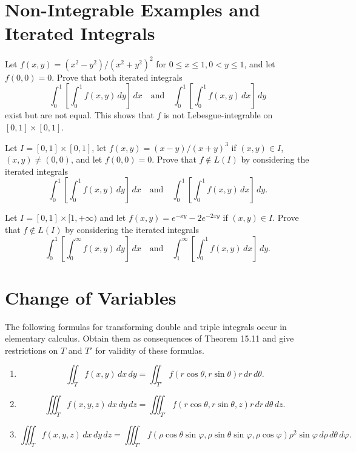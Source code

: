 \section{Non-Integrable Examples and Iterated Integrals}

\begin{problembox}
Let \( f(x, y) = (x^2 - y^2)/(x^2 + y^2)^2 \) for \( 0 \leq x \leq 1, 0 < y \leq 1 \), and let \( f(0, 0) = 0 \). Prove that both iterated integrals
\[
\int_0^1 \left[ \int_0^1 f(x, y) \, dy \right] \, dx \quad \text{and} \quad \int_0^1 \left[ \int_0^1 f(x, y) \, dx \right] \, dy
\]
exist but are not equal. This shows that \( f \) is not Lebesgue-integrable on \([0, 1] \times [0, 1]\).
\end{problembox}

\begin{problembox}
Let \( I = [0, 1] \times [0, 1] \), let \( f(x, y) = (x - y)/(x + y)^3 \) if \( (x, y) \in I \), \( (x, y) \neq (0, 0) \), and let \( f(0, 0) = 0 \). Prove that \( f \notin L(I) \) by considering the iterated integrals
\[
\int_0^1 \left[ \int_0^1 f(x, y) \, dy \right] \, dx \quad \text{and} \quad \int_0^1 \left[ \int_0^1 f(x, y) \, dx \right] \, dy.
\]
\end{problembox}

\begin{problembox}
Let \( I = [0, 1] \times [1, +\infty) \) and let \( f(x, y) = e^{-xy} - 2e^{-2xy} \) if \( (x, y) \in I \). Prove that \( f \notin L(I) \) by considering the iterated integrals
\[
\int_0^1 \left[ \int_0^\infty f(x, y) \, dy \right] \, dx \quad \text{and} \quad \int_1^\infty \left[ \int_0^1 f(x, y) \, dx \right] \, dy.
\]
\end{problembox}

\section{Change of Variables}

\begin{problembox}
The following formulas for transforming double and triple integrals occur in elementary calculus. Obtain them as consequences of Theorem 15.11 and give restrictions on \( T \) and \( T' \) for validity of these formulas.
\begin{enumerate}[label=(\alph*)]
\item \[ \iint_T f(x, y) \, dx \, dy = \iint_{T'} f(r \cos \theta, r \sin \theta)r \, dr \, d\theta.\]
\item \[ \iiint_T f(x, y, z) \, dx \, dy \, dz = \iiint_{T'} f(r \cos \theta, r \sin \theta, z)r \, dr \, d\theta \, dz.\]
\item \[ \iiint_T f(x, y, z) \, dx \, dy \, dz = \iiint_{T'} f(\rho \cos \theta \sin \varphi, \rho \sin \theta \sin \varphi, \rho \cos \varphi) \rho^2 \sin \varphi \, d\rho \, d\theta \, d\varphi.\]
\end{enumerate}
\end{problembox}

